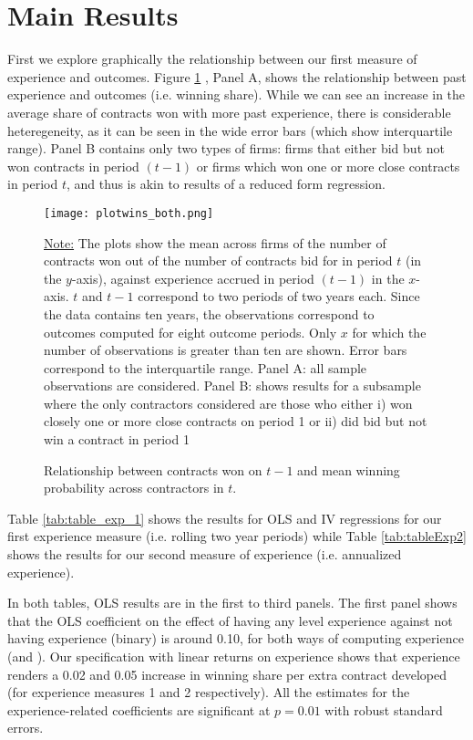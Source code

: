 \section{Main Results}

First we explore graphically the relationship between our first measure of experience and outcomes. Figure \ref{fig:plotresults_both} , Panel A, shows the relationship between past experience and outcomes (i.e. winning share). While we can see an increase in the average share of contracts won with more past experience, there is considerable heteregeneity, as it can be seen in the wide error bars (which show interquartile range). Panel B contains only two types of firms: firms that either bid but not won contracts in period $(t-1)$ or firms which won one or more close contracts in period $t$, and thus is akin to results of a reduced form regression.

\begin{figure}
  \texttt{[image: plotwins\_both.png]}
  \caption{Relationship between contracts won on $t-1$ and mean winning probability across contractors in $t$.}
  \label{fig:plotresults_both}
  \vskip 0.5mm
  { \footnotesize \underline{Note:} The plots show the mean across firms of the number of contracts won out of the number of contracts bid for in period $t$ (in the $y$-axis), against experience accrued in period $(t-1)$ in the $x$-axis. $t$ and $t-1$ correspond to two periods of two years each. Since the data contains ten years, the observations correspond to outcomes computed for eight outcome periods.  Only $x$ for which the number of observations is greater than ten are shown. Error bars correspond to the interquartile range. Panel A: all sample observations are considered. Panel B:  shows results for a subsample where the only contractors considered are those who either i) won closely one or more close contracts  on period 1 or ii) did bid but not win a contract in period 1\par}
\end{figure}

Table \ref{tab:table_exp_1} shows the results for OLS and IV regressions for our first experience measure (i.e. rolling two year periods) while Table \ref{tab:tableExp2} shows the results for our second measure of experience (i.e. annualized experience).

In both tables, OLS results are in the first to third panels. The first panel shows that the OLS coefficient on the effect of having any level experience against not having experience (binary) is around 0.10, for both ways of computing experience (and ). Our specification with linear returns on experience shows that experience renders a 0.02 and 0.05 increase in winning share per extra contract developed (for experience measures 1 and 2 respectively). All the estimates for the experience-related coefficients are significant at $p=0.01$ with robust standard errors.


